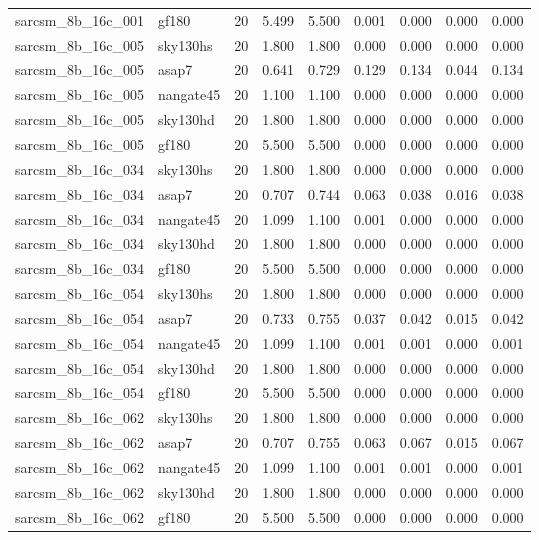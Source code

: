\begin{tabular}{llrrrrrrr}
sarcsm\_8b\_16c\_001 & gf180 & 20 & 5.499 & 5.500 & 0.001 & 0.000 & 0.000 & 0.000 \\
sarcsm\_8b\_16c\_005 & sky130hs & 20 & 1.800 & 1.800 & 0.000 & 0.000 & 0.000 & 0.000 \\
sarcsm\_8b\_16c\_005 & asap7 & 20 & 0.641 & 0.729 & 0.129 & 0.134 & 0.044 & 0.134 \\
sarcsm\_8b\_16c\_005 & nangate45 & 20 & 1.100 & 1.100 & 0.000 & 0.000 & 0.000 & 0.000 \\
sarcsm\_8b\_16c\_005 & sky130hd & 20 & 1.800 & 1.800 & 0.000 & 0.000 & 0.000 & 0.000 \\
sarcsm\_8b\_16c\_005 & gf180 & 20 & 5.500 & 5.500 & 0.000 & 0.000 & 0.000 & 0.000 \\
sarcsm\_8b\_16c\_034 & sky130hs & 20 & 1.800 & 1.800 & 0.000 & 0.000 & 0.000 & 0.000 \\
sarcsm\_8b\_16c\_034 & asap7 & 20 & 0.707 & 0.744 & 0.063 & 0.038 & 0.016 & 0.038 \\
sarcsm\_8b\_16c\_034 & nangate45 & 20 & 1.099 & 1.100 & 0.001 & 0.000 & 0.000 & 0.000 \\
sarcsm\_8b\_16c\_034 & sky130hd & 20 & 1.800 & 1.800 & 0.000 & 0.000 & 0.000 & 0.000 \\
sarcsm\_8b\_16c\_034 & gf180 & 20 & 5.500 & 5.500 & 0.000 & 0.000 & 0.000 & 0.000 \\
sarcsm\_8b\_16c\_054 & sky130hs & 20 & 1.800 & 1.800 & 0.000 & 0.000 & 0.000 & 0.000 \\
sarcsm\_8b\_16c\_054 & asap7 & 20 & 0.733 & 0.755 & 0.037 & 0.042 & 0.015 & 0.042 \\
sarcsm\_8b\_16c\_054 & nangate45 & 20 & 1.099 & 1.100 & 0.001 & 0.001 & 0.000 & 0.001 \\
sarcsm\_8b\_16c\_054 & sky130hd & 20 & 1.800 & 1.800 & 0.000 & 0.000 & 0.000 & 0.000 \\
sarcsm\_8b\_16c\_054 & gf180 & 20 & 5.500 & 5.500 & 0.000 & 0.000 & 0.000 & 0.000 \\
sarcsm\_8b\_16c\_062 & sky130hs & 20 & 1.800 & 1.800 & 0.000 & 0.000 & 0.000 & 0.000 \\
sarcsm\_8b\_16c\_062 & asap7 & 20 & 0.707 & 0.755 & 0.063 & 0.067 & 0.015 & 0.067 \\
sarcsm\_8b\_16c\_062 & nangate45 & 20 & 1.099 & 1.100 & 0.001 & 0.001 & 0.000 & 0.001 \\
sarcsm\_8b\_16c\_062 & sky130hd & 20 & 1.800 & 1.800 & 0.000 & 0.000 & 0.000 & 0.000 \\
sarcsm\_8b\_16c\_062 & gf180 & 20 & 5.500 & 5.500 & 0.000 & 0.000 & 0.000 & 0.000 \\

\end{tabular}
